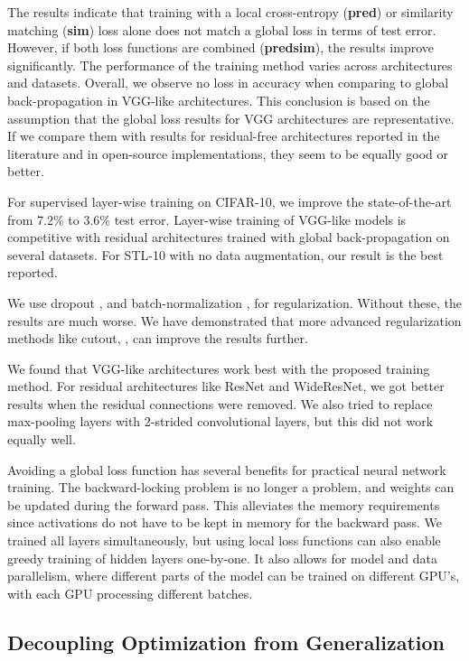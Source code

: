 \documentclass{article}
\begin{document}
The results indicate that training with a local cross-entropy (\textbf{pred}) or similarity matching (\textbf{sim}) loss alone does not match a global loss in terms of test error. However, if both loss functions are combined (\textbf{predsim}), the results improve significantly. The performance of the training method varies across architectures and datasets. Overall, we observe no loss in accuracy when comparing to global back-propagation in VGG-like architectures. This conclusion is based on the assumption that the global loss results for VGG architectures are representative. If we compare them with results for residual-free architectures reported in the literature and in open-source implementations, they seem to be equally good or better.

For supervised layer-wise training on CIFAR-10, we improve the state-of-the-art from 7.2\% \cite{BelilovskyEO18} to 3.6\% test error. Layer-wise training of VGG-like models is competitive with residual architectures trained with global back-propagation on several datasets. For STL-10 with no data augmentation, our result is the best reported.

We use dropout \cite{SrivastavaHKSS14}, and batch-normalization \cite{IoffeS15}, for regularization. Without these, the results are much worse. We have demonstrated that more advanced regularization methods like cutout, \cite{DevriesT17}, can improve the results further.

We found that VGG-like architectures work best with the proposed training method. For residual architectures like ResNet and WideResNet, we got better results when the residual connections were removed. We also tried to replace max-pooling layers with 2-strided convolutional layers, but this did not work equally well.

Avoiding a global loss function has several benefits for practical neural network training. The backward-locking problem is no longer a problem, and weights can be updated during the forward pass. This alleviates the memory requirements since activations do not have to be kept in memory for the backward pass. We trained all layers simultaneously, but using local loss functions can also enable greedy training of hidden layers one-by-one. It also allows for model and data parallelism, where different parts of the model can be trained on different GPU's, with each GPU processing different batches.

\subsection{Decoupling Optimization from Generalization}
\end{document}
